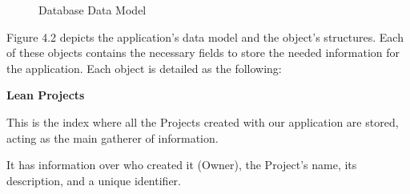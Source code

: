 \documentclass[a4paper,twoside,10pt]{report}
\begin{document}
\begin{figure}[h!]
  \center
  \caption{Database Data Model}
\end{figure}

Figure 4.2 depicts the application's data model and the object's structures. Each of these objects contains the necessary fields to store the needed information for the application. 
\newpage
Each object is detailed as the following:
\newline

\textbf{Lean Projects}

This is the index where all the Projects created with our application are stored, acting as the main gatherer of information.

It has information over who created it (Owner), the Project's name, its description, and a unique identifier.
\end{document}
